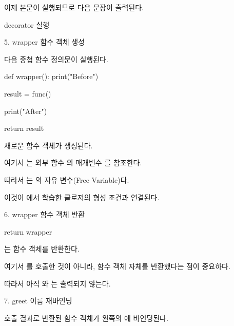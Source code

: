 이제  본문이 실행되므로 다음 문장이 출력된다.

\begin{dhkzsh}
decorator 실행
\end{dhkzsh}

\begin{dhknote}
\begin{dhksmry}[centered]
5. wrapper 함수 객체 생성
\end{dhksmry}
\end{dhknote}

다음 중첩 함수 정의문이 실행된다.

\begin{dhkcode}
def wrapper():
    print("Before")

    result = func()

    print("After")

    return result
\end{dhkcode}

새로운  함수 객체가 생성된다.

여기서 는 외부 함수 의 매개변수 를 참조한다.

따라서 는 의 자유 변수(Free Variable)다.

이것이 에서 학습한 클로저의 형성 조건과 연결된다.

\begin{dhknote}
\begin{dhksmry}[centered]
6. wrapper 함수 객체 반환
\end{dhksmry}
\end{dhknote}

\begin{dhkcode}
return wrapper
\end{dhkcode}

는  함수 객체를 반환한다.

여기서 를 호출한 것이 아니라, 함수 객체 자체를 반환했다는 점이 중요하다.

따라서 아직 와 는 출력되지 않는다.

\begin{dhknote}
\begin{dhksmry}[centered]
7. greet 이름 재바인딩
\end{dhksmry}
\end{dhknote}

 호출 결과로 반환된  함수 객체가 왼쪽의 에 바인딩된다.


